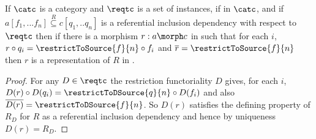 \begin{aside}
\begin{lemma}
\label{catRefIncSublemma}
If $\catc$ is a category and $\reqtc$ is a set of instances,
if \fnsourceqnsource in $\catc$, 
and if $a[f_1,...f_n] \overset{R}{\subseteq} c[q_1,..q_n]$ 
is a referential inclusion dependency with respect to $\reqtc$ 
then if there is a morphism $r: a \morph c$ in \catcw 
such that for each $i$, 
$r \circ q_i = \restrictToSource{f}{n} \circ f_i$
and $\overline{r} = \restrictToSource{f}{n}$ 
then $r$ is a representation of $R$  in  \catc.\footnotemark
\end{lemma}
\begin{proof}
For any $D \in \reqtc$ the restriction functoriality  $D$ gives, 
for each $i$, 
$D(r) \circ D(q_i) = \restrictToDSource{q}{n} \circ D(f_i)$
and also \nudgeup{0.425cm}$\overline{D(r)}=\restrictToDSource{f}{n}$.
So $D(r)$ satisfies the defining property of 
$R_D$ for $R$ as a referential inclusion dependency and hence by uniqueness $D(r)=R_D$.
\end{proof}
\end{aside}
